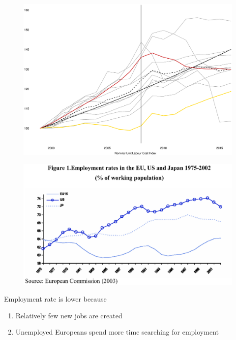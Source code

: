 \documentclass{beamer}
\begin{document}
\begin{frame}
  \begin{figure}
    \includegraphics[scale=.3]{unit_labour_cost.eps}
  \end{figure}
\end{frame}

\begin{frame}
  \begin{figure}
    \includegraphics[scale=.7]{employment_rate.eps}
  \end{figure}
\end{frame}

\begin{frame}
  Employment rate is lower because
  \begin{enumerate}
    \item Relatively few new jobs are created
    \item Unemployed Europeans spend more time searching for employment  
  \end{enumerate}
\end{frame}
\end{document}
